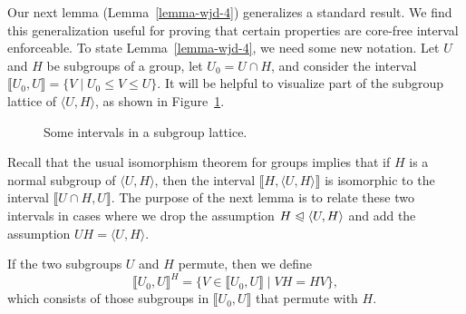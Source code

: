 \documentclass{gen-j-l}
\newcommand{\lb}{\ensuremath{\llbracket}}
\newcommand{\rb}{\ensuremath{\rrbracket}}
\newcommand{\<}{\ensuremath{\langle}}
\renewcommand{\>}{\ensuremath{\rangle}}
\theoremstyle{plain}
\theoremstyle{definition}
\theoremstyle{remark}
\numberwithin{theorem}{section}
\numberwithin{claim}{section}
\numberwithin{equation}{section}
\numberwithin{conjecture}{section}
\renewcommand{\leq}{\ensuremath{\leqslant}}
\newcommand{\subnormal}{\ensuremath{\trianglelefteqslant}}
\newcommand{\2}{\ensuremath{\mathbf{2}}}
\newcommand{\3}{\ensuremath{\mathbf{3}}}
\newcommand{\dotsize}{.8pt}
\begin{document}
Our next lemma (Lemma~\ref{lemma-wjd-4}) generalizes a standard
result.  We find this generalization useful for proving that certain properties are
core-free interval enforceable.
To state Lemma~\ref{lemma-wjd-4}, we need some new notation.  
Let $U$ and $H$ be subgroups of a group,
let $U_0 = U\cap H$, and consider the interval $\lb U_0, U \rb=\{ V \mid U_0 \leq V
\leq U\}$.   
It will be helpful to visualize part of the subgroup lattice of
$\<U,H\>$, as shown in Figure~\ref{fig:intervals}.


\begin{figure}[!h]
\begin{center}
\end{center}
  \caption{Some intervals in a subgroup lattice.}
  \label{fig:intervals}
\end{figure}

Recall that the usual isomorphism theorem for groups implies
that 
if $H$ is a normal subgroup of $\<U, H\>$, 
then the interval
$\lb H, \<U, H\> \rb$ is isomorphic to the interval $\lb U\cap H, U \rb$.  The 
purpose of the next lemma is to relate these two
intervals in cases where we drop the assumption $H\subnormal \<U,H\>$
and add the assumption $UH = \<U,H\>$.

If the two subgroups $U$ and $H$ permute, then we define 
\begin{equation}
  \label{eq:dedekind-1}
\lb U_0, U \rb^H = \{ V\in \lb U_0,U \rb \mid VH = HV\},
\end{equation}
which consists of those subgroups in $\lb U_0, U \rb$ that permute with
$H$. 
\end{document}
